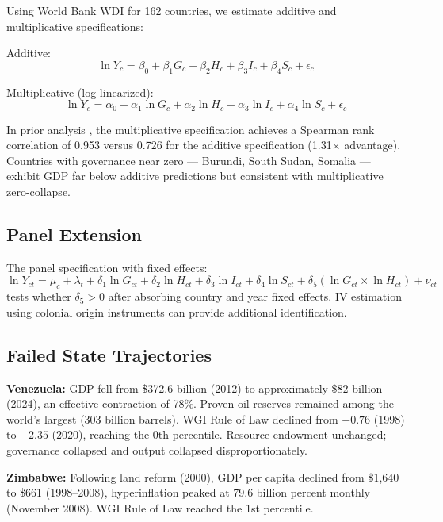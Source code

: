 \documentclass[12pt]{article}
\begin{document}
Using World Bank WDI for 162 countries, we estimate additive and multiplicative specifications:

\noindent Additive:
\begin{equation}
\ln Y_c = \beta_0 + \beta_1 G_c + \beta_2 H_c + \beta_3 I_c + \beta_4 S_c + \epsilon_c
\end{equation}

\noindent Multiplicative (log-linearized):
\begin{equation}
\ln Y_c = \alpha_0 + \alpha_1 \ln G_c + \alpha_2 \ln H_c + \alpha_3 \ln I_c + \alpha_4 \ln S_c + \epsilon_c
\end{equation}

In prior analysis \citep{kirsch2026mc}, the multiplicative specification achieves a Spearman rank correlation of 0.953 versus 0.726 for the additive specification (1.31$\times$ advantage). Countries with governance near zero --- Burundi, South Sudan, Somalia --- exhibit GDP far below additive predictions but consistent with multiplicative zero-collapse.

\subsection{Panel Extension}

The panel specification with fixed effects:
\begin{equation}
\ln Y_{ct} = \mu_c + \lambda_t + \delta_1 \ln G_{ct} + \delta_2 \ln H_{ct} + \delta_3 \ln I_{ct} + \delta_4 \ln S_{ct} + \delta_5 (\ln G_{ct} \times \ln H_{ct}) + \nu_{ct}
\end{equation}
tests whether $\delta_5 > 0$ after absorbing country and year fixed effects. IV estimation using colonial origin instruments \citep{acemoglu2001colonial} can provide additional identification.

\subsection{Failed State Trajectories}

\textbf{Venezuela:} GDP fell from \$372.6 billion (2012) to approximately \$82 billion (2024), an effective contraction of 78\%. Proven oil reserves remained among the world's largest (303 billion barrels). WGI Rule of Law declined from $-0.76$ (1998) to $-2.35$ (2020), reaching the 0th percentile. Resource endowment unchanged; governance collapsed and output collapsed disproportionately.

\textbf{Zimbabwe:} Following land reform (2000), GDP per capita declined from \$1,640 to \$661 (1998--2008), hyperinflation peaked at 79.6 billion percent monthly (November 2008). WGI Rule of Law reached the 1st percentile.
\end{document}
